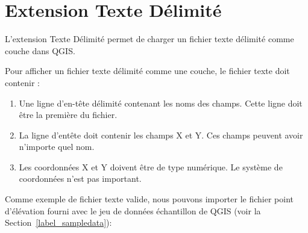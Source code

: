 
\section{Extension Texte Délimité}\label{label_dltext}    


L'extension Texte Délimité permet de charger un fichier texte délimité comme 
couche dans QGIS. 


Pour afficher un fichier texte délimité comme une couche, le fichier texte 
doit contenir :

\begin{enumerate}      
\item Une ligne d'en-tête délimité contenant les noms des champs. Cette ligne 
doit être la première du fichier.
\item La ligne d'entête doit contenir les champs X et Y. Ces champs peuvent 
avoir n'importe quel nom.
\item Les coordonnées X et Y doivent être de type numérique. Le système de 
coordonnées n'est pas important.
\end{enumerate}

Comme exemple de fichier texte valide, nous pouvons importer le fichier point 
d'élévation  fourni avec le jeu de données échantillon de 
QGIS (voir la Section~\ref{label_sampledata}):

